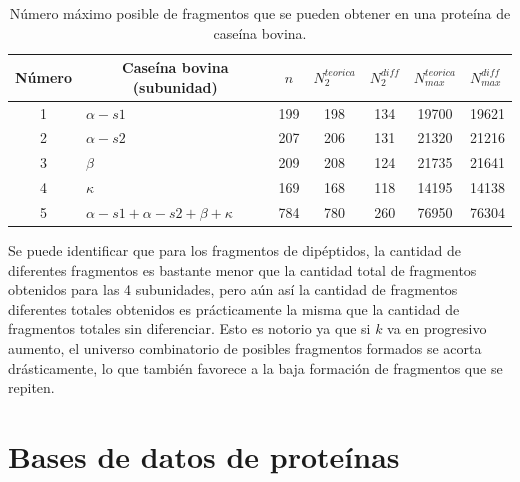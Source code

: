 \begin{table}[H]
\centering
\label{my-label4}
\begin{tabular}{|c|l|c|c|c|c|c|}
\hline
Número & \multicolumn{1}{c|}{Caseína bovina (subunidad)} & $n$ & $N_{2}^{teorica}$ & \multicolumn{1}{l|}{$N_{2}^{diff}$} & \multicolumn{1}{l|}{$N_{max}^{teorica}$} & \multicolumn{1}{l|}{$N_{max}^{diff}$} \\ \hline
1      & $\alpha - s1$                                   & 199 & 198               & 134                                 & 19700                                     & 19621                                  \\
2      & $\alpha - s2$                                   & 207 & 206               & 131                                 & 21320                                     & 21216                                  \\
3      & $\beta$                                         & 209 & 208               & 124                                 & 21735                                     & 21641                                  \\
4      & $\kappa$                                        & 169 & 168               & 118                                 & 14195                                     & 14138                                  \\
5      & $\alpha - s1 + \alpha - s2 + \beta + \kappa$    & 784 & 780               & 260                                 & 76950                                     & 76304                                  \\ \hline
\end{tabular}
\caption{Número máximo posible de fragmentos que se pueden obtener en una proteína de caseína bovina.}
\end{table}

Se puede identificar que para los fragmentos de dipéptidos, la cantidad de diferentes fragmentos es bastante menor que la cantidad total de fragmentos obtenidos para las 4 subunidades, pero aún así la cantidad de fragmentos diferentes totales obtenidos es prácticamente la misma que la cantidad de fragmentos totales sin diferenciar. Esto es notorio ya que si $k$ va en progresivo aumento, el universo combinatorio de posibles fragmentos formados se acorta drásticamente, lo que también favorece a la baja formación de fragmentos que se repiten.

\section{Bases de datos de proteínas}

